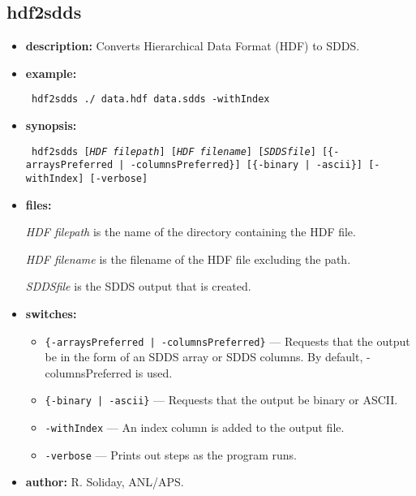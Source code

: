 %
%
\begin{latexonly}
\newpage
\end{latexonly}
\subsection{hdf2sdds}
\label{hdf2sdds}

\begin{itemize}
\item {\bf description:} Converts Hierarchical Data Format (HDF) to SDDS.
\item {\bf example:} 
\begin{flushleft}{\tt
hdf2sdds ./ data.hdf data.sdds -withIndex
}\end{flushleft}
\item {\bf synopsis:}
\begin{flushleft}{\tt
hdf2sdds [{\em HDF filepath}] [{\em HDF filename}] [{\em SDDSfile}]
[\{-arraysPreferred | -columnsPreferred\}]
[\{-binary | -ascii\}] [-withIndex] [-verbose]
}\end{flushleft}
\item {\bf files: }

{\em HDF filepath} is the name of the directory containing the HDF file.

{\em HDF filename} is the filename of the HDF file excluding the path.

{\em SDDSfile} is the SDDS output that is created.

\item {\bf switches:}
\begin{itemize}
    \item {\tt \{-arraysPreferred | -columnsPreferred\}} --- Requests that the output be in the form of an SDDS array or SDDS columns. By default, -columnsPreferred is used.
    \item {\tt \{-binary | -ascii\}} --- Requests that the output be binary or ASCII.
    \item {\tt -withIndex} --- An index column is added to the output file.
    \item {\tt -verbose} --- Prints out steps as the program runs.
\end{itemize}
\item {\bf author:} R. Soliday, ANL/APS.
\end{itemize}
